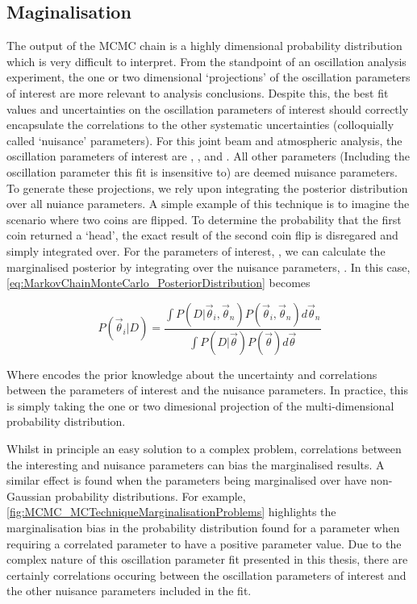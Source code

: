 \subsection{Maginalisation}
\label{sec:MarkovChainMonteCarlo_Marginalisation}

The output of the MCMC chain is a highly dimensional probability distribution which is very difficult to interpret. From the standpoint of an oscillation analysis experiment, the one or two dimensional `projections' of the oscillation parameters of interest are more relevant to analysis conclusions. Despite this, the best fit values and uncertainties on the oscillation parameters of interest should correctly encapsulate the correlations to the other systematic uncertainties (colloquially called `nuisance' parameters). For this joint beam and atmospheric analysis, the oscillation parameters of interest are \sinsqatm, \sinsqreac, \delmsqatm and \dcp. All other parameters (Including the oscillation parameter this fit is insensitive to) are deemed nuisance parameters. To generate these projections, we rely upon integrating the posterior distribution over all nuiance parameters. A simple example of this technique is to imagine the scenario where two coins are flipped. To determine the probability that the first coin returned a `head', the exact result of the second coin flip is disregared and simply integrated over. For the parameters of interest, , we can calculate the marginalised posterior by integrating over the nuisance parameters, . In this case, \autoref{eq:MarkovChainMonteCarlo_PosteriorDistribution} becomes

\begin{equation}
P(\vec{\theta}_{i}|D) = \frac{\int P(D|\vec{\theta}_{i},\vec{\theta}_{n}) P(\vec{\theta}_{i},\vec{\theta}_{n}) d\vec{\theta}_{n}}{\int P(D|\vec{\theta}) P(\vec{\theta}) d\vec{\theta}}
\end{equation}

Where  encodes the prior knowledge about the uncertainty and correlations between the parameters of interest and the nuisance parameters. In practice, this is simply taking the one or two dimesional projection of the multi-dimensional probability distribution.

Whilst in principle an easy solution to a complex problem, correlations between the interesting and nuisance parameters can bias the marginalised results. A similar effect is found when the parameters being marginalised over have non-Gaussian probability distributions. For example, \autoref{fig:MCMC_MCTechniqueMarginalisationProblems} highlights the marginalisation bias in the probability distribution found for a parameter when requiring a correlated parameter to have a positive parameter value. Due to the complex nature of this oscillation parameter fit presented in this thesis, there are certainly correlations occuring between the oscillation parameters of interest and the other nuisance parameters included in the fit.

